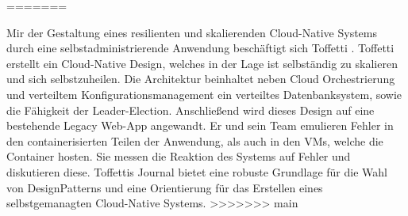 \documentclass[11pt]{scrartcl}
\newcommand{\qto}[1]{\glqq #1\grqq}				%
\newcommand{\zB}{\mbox{z.\,B.}\xspace}
\begin{document}
%	
%
%
%
%
=======

Mir der Gestaltung eines resilienten und skalierenden Cloud-Native Systems durch eine selbstadministrierende Anwendung beschäftigt sich Toffetti \cite{Toffetti:2017}. Toffetti erstellt ein Cloud-Native Design, welches in der Lage ist selbständig zu skalieren und sich selbstzuheilen. Die Architektur beinhaltet neben Cloud Orchestrierung und verteiltem Konfigurationsmanagement ein verteiltes Datenbanksystem, sowie die Fähigkeit der Leader-Election. Anschließend wird dieses Design auf eine bestehende Legacy Web-App angewandt. Er und sein Team emulieren Fehler in den containerisierten Teilen der Anwendung, als auch in den VMs, welche die Container hosten. Sie messen die Reaktion des Systems auf Fehler und diskutieren diese. Toffettis Journal bietet eine robuste Grundlage für die Wahl von DesignPatterns und eine Orientierung für das Erstellen eines selbstgemanagten Cloud-Native Systems.
>>>>>>> main
\end{document}
